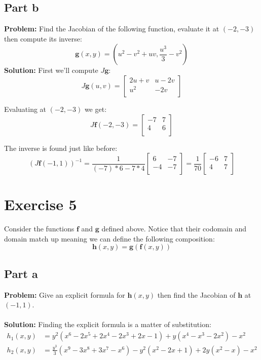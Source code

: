 \documentclass{article}
\begin{document}
\subsection*{Part b}
\textbf{Problem:} Find the Jacobian of the following function, evaluate it at $(-2,-3)$ then compute its inverse:
$$\mathbf g(x,y)=\left(u^2-v^2+uv,\frac{u^3}{3}-v^2\right)$$
\textbf{Solution:} First we'll compute $J\mathbf g$:
$$J\mathbf g(u,v)=
\begin{bmatrix}
    2u+v & u-2v \\
    u^2 & -2v \\
\end{bmatrix}$$

Evaluating at $(-2,-3)$ we get:
$$J\mathbf f(-2,-3)=
\begin{bmatrix}
    -7 & 7 \\
    4 & 6 \\
\end{bmatrix}$$

The inverse is found just like before:
$$(J\mathbf f(-1,1))^{-1}=
\frac{1}{(-7)*6-7*4}\begin{bmatrix}
    6 & -7 \\
    -4 & -7 \\
\end{bmatrix}=
\frac{1}{70}\begin{bmatrix}
    -6 & 7 \\
    4 & 7 \\
\end{bmatrix}$$

\section*{Exercise 5}
Consider the functions $\mathbf f$ and $\mathbf g$ defined above. Notice that their codomain and domain match up meaning we can define the following composition:
$$\mathbf h(x,y)=\mathbf g(\mathbf f(x,y))$$
\subsection*{Part a}
\textbf{Problem:} Give an explicit formula for $\mathbf h(x,y)$ then find the Jacobian of $\mathbf h$ at $(-1,1)$.
\\\\
\textbf{Solution:} Finding the explicit formula is a matter of substitution:
\begin{align*}
  h_1(x,y)&=y^2(x^6-2x^5+2x^4-2x^3+2x-1)+y(x^4-x^3-2x^2)-x^2\\
  h_2(x,y)&=\frac{y^3}{3}(x^9-3x^8+3x^7-x^6)-y^2(x^2-2x+1)+2y(x^2-x)-x^2
\end{align*}
\end{document}
